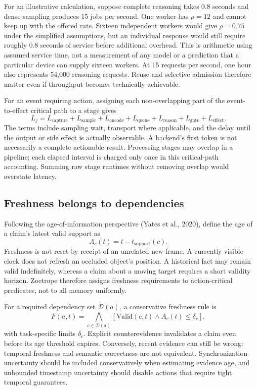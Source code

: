 \documentclass[11pt,letterpaper]{article}
\begin{document}
For an illustrative calculation, suppose complete reasoning takes 0.8 seconds and dense sampling produces 15 jobs per second. One worker has $\rho=12$ and cannot keep up with the offered rate. Sixteen independent workers would give $\rho=0.75$ under the simplified assumptions, but an individual response would still require roughly 0.8 seconds of service before additional overhead. This is arithmetic using assumed service time, not a measurement of any model or a prediction that a particular device can supply sixteen workers. At 15 requests per second, one hour also represents 54,000 reasoning requests. Reuse and selective admission therefore matter even if throughput becomes technically achievable.

For an event requiring action, assigning each non-overlapping part of the event-to-effect critical path to a stage gives
\begin{equation}
 L_j=L_{\mathrm{capture}}+L_{\mathrm{sample}}+L_{\mathrm{encode}}
       +L_{\mathrm{queue}}+L_{\mathrm{reason}}+L_{\mathrm{gate}}+L_{\mathrm{effect}}.
 \label{eq:latency}
\end{equation}
The terms include sampling wait, transport where applicable, and the delay until the output or side effect is actually observable. A backend's first token is not necessarily a complete actionable result. Processing stages may overlap in a pipeline; each elapsed interval is charged only once in this critical-path accounting. Summing raw stage runtimes without removing overlap would overstate latency.

\subsection{Freshness belongs to dependencies}
Following the age-of-information perspective (Yates et al., 2020), define the age of a claim's latest valid support as
\begin{equation}
 A_c(t)=t-t_{\mathrm{support}}(c).
 \label{eq:age}
\end{equation}
Freshness is not reset by receipt of an unrelated new frame. A currently visible clock does not refresh an occluded object's position. A historical fact may remain valid indefinitely, whereas a claim about a moving target requires a short validity horizon. Zoetrope therefore assigns freshness requirements to action-critical predicates, not to all memory uniformly.

For a required dependency set $\mathcal{D}(a)$, a conservative freshness rule is
\begin{equation}
 F(a,t)=\bigwedge_{c\in\mathcal{D}(a)}
 \left[\mathrm{Valid}(c,t)\land A_c(t)\leq\delta_c\right],
 \label{eq:freshness}
\end{equation}
with task-specific limits $\delta_c$. Explicit counterevidence invalidates a claim even before its age threshold expires. Conversely, recent evidence can still be wrong: temporal freshness and semantic correctness are not equivalent. Synchronization uncertainty should be included conservatively when estimating evidence age, and unbounded timestamp uncertainty should disable actions that require tight temporal guarantees.
\end{document}

